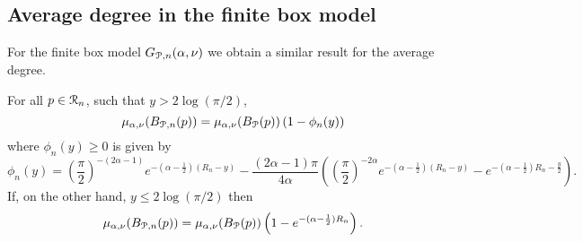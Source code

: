 \subsection{Average degree in the finite box model}\label{ssec:average_degree_P_n}

For the finite box model $G_{{\mathcal P},n}(\alpha, \nu)$ we obtain a similar result for the average degree.

\begin{lemma}\label{lem:average_degree_P_n}
For all $p \in {\mathcal R}_n$, such that $y > 2\log(\pi/2)$,
\[
	\mu_{\alpha,\nu}(B_{{\mathcal P},n}(p)) = \mu_{\alpha,\nu}(B_{{\mathcal P}}(p))\left(1 - \phi_n(y)\right)
\]
where $\phi_n(y) \ge 0$ is given by
\[
	\phi_n(y) = \left(\frac{\pi}{2}\right)^{-(2\alpha - 1)}e^{-(\alpha-\frac{1}{2})(R_n - y)}
	- \frac{(2\alpha - 1)\pi}{4\alpha}\left(\left(\frac{\pi}{2}\right)^{-2\alpha} 
	e^{-(\alpha - \frac{1}{2})(R_n - y)} - e^{-(\alpha - \frac{1}{2})R_n - \frac{y}{2}}\right).
\]
If, on the other hand, $y \le 2 \log(\pi/2)$ then
\[
	\mu_{\alpha,\nu}(B_{{\mathcal P},n}(p)) = \mu_{\alpha,\nu}(B_{{\mathcal P}}(p))\left(1 - e^{-(\alpha - \frac{1}{2})R_n}\right).
\]
\end{lemma}

